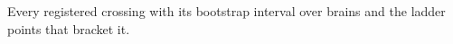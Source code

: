 \documentclass[11pt]{article}
\theoremstyle{definition}
\theoremstyle{plain}
\begin{document}
\begin{table}[h]
\centering\scriptsize

\caption{Every registered crossing with its bootstrap interval over brains and
the ladder points that bracket it.}
\label{tab:crossings}
\end{table}



\end{document}
